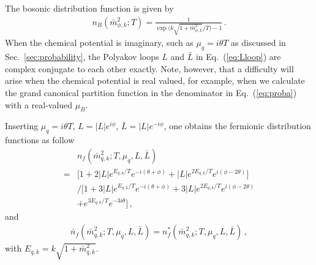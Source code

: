 \documentclass[%
reprint,
superscriptaddress,
showpacs,preprintnumbers,
 amsmath,amssymb,
 aps,
prd,
]{revtex4-1}
\def\Eq#1{Eq.~(\ref{#1})}
\def\sec#1{Sec.~\ref{#1}}
\begin{document}
The bosonic distribution function is given by
\begin{align}
  n_B(\bar{m}_{\phi,k}^{2};T)=\frac{1}{\exp\Big(k\sqrt{1+\bar{m}_{\phi,k}^{2}}\Big/T\Big)-1}\,.\label{}
\end{align}
When the chemical potential is imaginary, such as $\mu_q=i \theta T$ as discussed in \sec{sec:probability}, the Polyakov loops $L$ and $\bar L$ in \Eq{eq:Lloop} are complex conjugate to each other exactly. Note, however, that a difficulty will arise when the chemical potential is real valued, for example, when we calculate the grand canonical partition function in the denominator in \Eq{eq:proba} with a real-valued $\mu_B$. 

Inserting $\mu_q=i \theta T$, $L=|L| e^{i\phi}$, $\bar L=|L| e^{-i\phi}$, one obtains the fermionic distribution functions as follow
\begin{align} 
 &n_f(\bar{m}_{q,k}^{2};T,\mu_q,L,\bar L)\nonumber\\[2ex]
 =&\Big[1+2|L|e^{E_{q,k}/T}e^{-i(\theta+\phi)}+|L|e^{2E_{q,k}/T}e^{i(\phi-2\theta)}\Big]\nonumber\\[2ex]
   &\bigg/\Big[1+3|L|e^{E_{q,k}/T}e^{-i(\theta+\phi)}+3|L|e^{2E_{q,k}/T}e^{i(\phi-2\theta)}\nonumber\\[2ex]
   &+e^{3E_{q,k}/T}e^{-3i\theta}\Big]\,, \label{eq:mass} 
\end{align}
and 
\begin{align}
  \bar n_f(\bar{m}_{q,k}^{2};T,\mu_q,L,\bar L)=n_f^*(\bar{m}_{q,k}^{2};T,\mu_q,L,\bar L)\,,\label{}
\end{align}
with $E_{q,k}=k\sqrt{1+\bar{m}_{q,k}^{2}}$.
\end{document}

